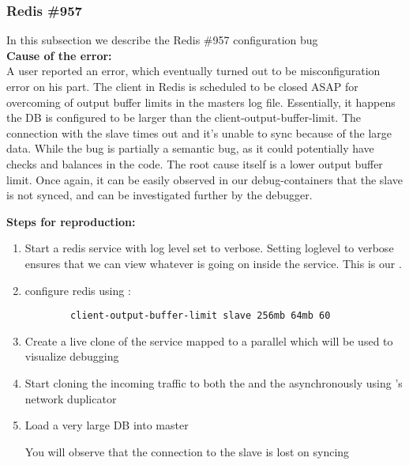 \subsubsection{Redis \#957}

In this subsection we describe the Redis \#957 configuration bug \\

\noindent \textbf{Cause of the error:} \\

A user reported an error, which eventually turned out to be misconfiguration error on his part.
The client in Redis is scheduled to be closed ASAP for overcoming of output buffer limits in the masters log file.
Essentially, it happens the DB is configured to be larger than the client-output-buffer-limit.
The connection with the slave times out and it's unable to sync because of the large data.
While the bug is partially a semantic bug, as it could potentially have checks and balances in the code. 
The root cause itself is a lower output buffer limit.
Once again, it can be easily observed in our debug-containers that the slave is not synced, and can be investigated further by the debugger.

\noindent \textbf{Steps for reproduction:} \\

\begin{adjustwidth}{0.5cm}{}
	\begin{enumerate}
		\item Start a redis service with log level set to verbose. Setting loglevel to verbose ensures that we can view whatever is going on inside the service. This is our \productioncontainer.
		\item configure redis using :
		
		\begin{lstlisting}
		client-output-buffer-limit slave 256mb 64mb 60
		\end{lstlisting}
		
		\item Create a live clone of the service mapped to a parallel \debugcontainer which will be used to visualize debugging
		\item Start cloning the incoming traffic to both the \productioncontainer and the \debugcontainer asynchronously using \parikshan's network duplicator
		
		\item Load a very large DB into master
		
		You will observe that the connection to the slave is lost on syncing
		
	\end{enumerate}
\end{adjustwidth}


